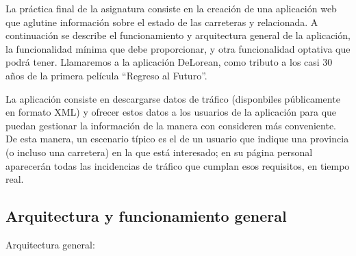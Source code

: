 La práctica final de la asignatura consiste en la creación de una aplicación web que aglutine información sobre el estado de las carreteras y relacionada. A continuación se describe el funcionamiento y arquitectura general de la aplicación, la funcionalidad mínima que debe proporcionar, y otra funcionalidad optativa que podrá tener. Llamaremos a la aplicación DeLorean, como tributo a los casi 30 años de la primera película ``Regreso al Futuro''.

La aplicación consiste en descargarse datos de tráfico (disponbiles públicamente en formato XML) y ofrecer estos datos a los usuarios de la aplicación para que puedan gestionar la información de la manera con consideren más conveniente. De esta manera, un escenario típico es el de un usuario que indique una provincia (o incluso una carretera) en la que está interesado; en su página personal aparecerán todas las incidencias de tráfico que cumplan esos requisitos, en tiempo real.

\subsection{Arquitectura y funcionamiento general}

Arquitectura general:

